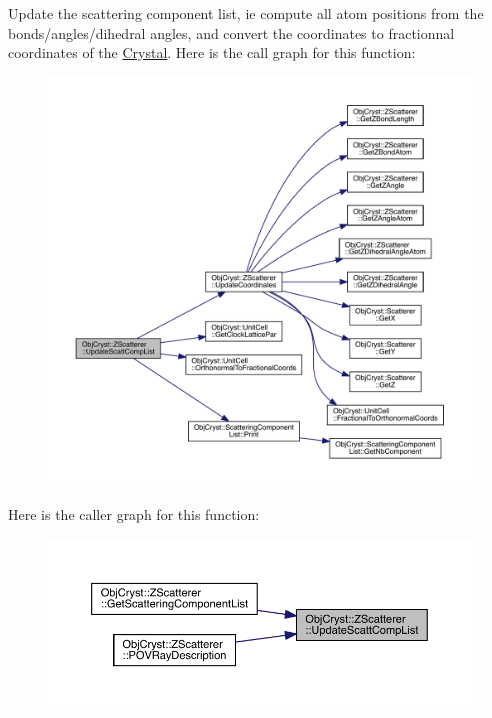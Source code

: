Update the scattering component list, ie compute all atom positions from the bonds/angles/dihedral angles, and convert the coordinates to fractionnal coordinates of the \mbox{\hyperlink{class_obj_cryst_1_1_crystal}{Crystal}}. Here is the call graph for this function\+:
\nopagebreak
\begin{figure}[H]
\begin{center}
\leavevmode
\includegraphics[width=350pt]{class_obj_cryst_1_1_z_scatterer_acec423f3f42ba0b1c173d8bc9fe96279_cgraph}
\end{center}
\end{figure}
Here is the caller graph for this function\+:
\nopagebreak
\begin{figure}[H]
\begin{center}
\leavevmode
\includegraphics[width=350pt]{class_obj_cryst_1_1_z_scatterer_acec423f3f42ba0b1c173d8bc9fe96279_icgraph}
\end{center}
\end{figure}


